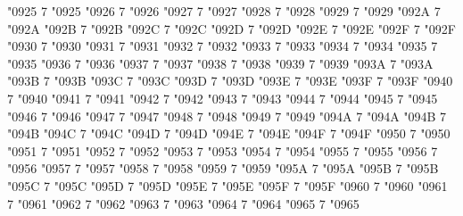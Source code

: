 \Umathcode "0925 7 \symoperators "0925%
\Umathcode "0926 7 \symoperators "0926%
\Umathcode "0927 7 \symoperators "0927%
\Umathcode "0928 7 \symoperators "0928%
\Umathcode "0929 7 \symoperators "0929%
\Umathcode "092A 7 \symoperators "092A%
\Umathcode "092B 7 \symoperators "092B%
\Umathcode "092C 7 \symoperators "092C%
\Umathcode "092D 7 \symoperators "092D%
\Umathcode "092E 7 \symoperators "092E%
\Umathcode "092F 7 \symoperators "092F%
%
\Umathcode "0930 7 \symoperators "0930%
\Umathcode "0931 7 \symoperators "0931%
\Umathcode "0932 7 \symoperators "0932%
\Umathcode "0933 7 \symoperators "0933%
\Umathcode "0934 7 \symoperators "0934%
\Umathcode "0935 7 \symoperators "0935%
\Umathcode "0936 7 \symoperators "0936%
\Umathcode "0937 7 \symoperators "0937%
\Umathcode "0938 7 \symoperators "0938%
\Umathcode "0939 7 \symoperators "0939%
\Umathcode "093A 7 \symoperators "093A%
\Umathcode "093B 7 \symoperators "093B%
\Umathcode "093C 7 \symoperators "093C%
\Umathcode "093D 7 \symoperators "093D%
\Umathcode "093E 7 \symoperators "093E%
\Umathcode "093F 7 \symoperators "093F%
%
\Umathcode "0940 7 \symoperators "0940%
\Umathcode "0941 7 \symoperators "0941%
\Umathcode "0942 7 \symoperators "0942%
\Umathcode "0943 7 \symoperators "0943%
\Umathcode "0944 7 \symoperators "0944%
\Umathcode "0945 7 \symoperators "0945%
\Umathcode "0946 7 \symoperators "0946%
\Umathcode "0947 7 \symoperators "0947%
\Umathcode "0948 7 \symoperators "0948%
\Umathcode "0949 7 \symoperators "0949%
\Umathcode "094A 7 \symoperators "094A%
\Umathcode "094B 7 \symoperators "094B%
\Umathcode "094C 7 \symoperators "094C%
\Umathcode "094D 7 \symoperators "094D%
\Umathcode "094E 7 \symoperators "094E%
\Umathcode "094F 7 \symoperators "094F%
%
\Umathcode "0950 7 \symoperators "0950%
\Umathcode "0951 7 \symoperators "0951%
\Umathcode "0952 7 \symoperators "0952%
\Umathcode "0953 7 \symoperators "0953%
\Umathcode "0954 7 \symoperators "0954%
\Umathcode "0955 7 \symoperators "0955%
\Umathcode "0956 7 \symoperators "0956%
\Umathcode "0957 7 \symoperators "0957%
\Umathcode "0958 7 \symoperators "0958%
\Umathcode "0959 7 \symoperators "0959%
\Umathcode "095A 7 \symoperators "095A%
\Umathcode "095B 7 \symoperators "095B%
\Umathcode "095C 7 \symoperators "095C%
\Umathcode "095D 7 \symoperators "095D%
\Umathcode "095E 7 \symoperators "095E%
\Umathcode "095F 7 \symoperators "095F%
%
\Umathcode "0960 7 \symoperators "0960%
\Umathcode "0961 7 \symoperators "0961%
\Umathcode "0962 7 \symoperators "0962%
\Umathcode "0963 7 \symoperators "0963%
\Umathcode "0964 7 \symoperators "0964%
\Umathcode "0965 7 \symoperators "0965%
